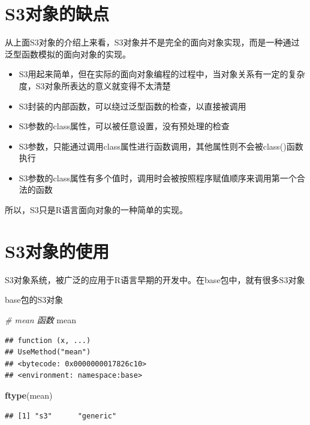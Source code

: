 \documentclass[]{book}
\newenvironment{Shaded}{\begin{snugshade}}{\end{snugshade}}
\newcommand{\KeywordTok}[1]{\textcolor[rgb]{0.13,0.29,0.53}{\textbf{#1}}}
\newcommand{\CommentTok}[1]{\textcolor[rgb]{0.56,0.35,0.01}{\textit{#1}}}
\newcommand{\NormalTok}[1]{#1}
\begin{document}
\section{S3对象的缺点}\label{s3}

从上面S3对象的介绍上来看，S3对象并不是完全的面向对象实现，而是一种通过泛型函数模拟的面向对象的实现。

\begin{itemize}
\item
  S3用起来简单，但在实际的面向对象编程的过程中，当对象关系有一定的复杂度，S3对象所表达的意义就变得不太清楚
\item
  S3封装的内部函数，可以绕过泛型函数的检查，以直接被调用
\item
  S3参数的class属性，可以被任意设置，没有预处理的检查
\item
  S3参数，只能通过调用class属性进行函数调用，其他属性则不会被class()函数执行
\item
  S3参数的class属性有多个值时，调用时会被按照程序赋值顺序来调用第一个合法的函数
\end{itemize}

所以，S3只是R语言面向对象的一种简单的实现。

\section{S3对象的使用}\label{s3}

S3对象系统，被广泛的应用于R语言早期的开发中。在base包中，就有很多S3对象

base包的S3对象

\begin{Shaded}
\begin{Highlighting}[]
\CommentTok{# mean 函数}
\NormalTok{mean}
\end{Highlighting}
\end{Shaded}

\begin{verbatim}
## function (x, ...) 
## UseMethod("mean")
## <bytecode: 0x0000000017826c10>
## <environment: namespace:base>
\end{verbatim}

\begin{Shaded}
\begin{Highlighting}[]
\KeywordTok{ftype}\NormalTok{(mean)}
\end{Highlighting}
\end{Shaded}

\begin{verbatim}
## [1] "s3"      "generic"
\end{verbatim}
\end{document}

